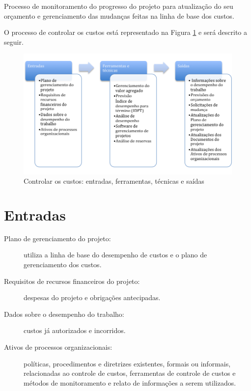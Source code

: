 
Processo de monitoramento do progresso do projeto para atualização do seu orçamento e gerenciamento das mudanças feitas na linha de base dos custos.

O processo de controlar os custos está representado na Figura \ref{fig:custos:controlar:efts} e será descrito a seguir.

\begin{figure}[!h]
	\centering
	\includegraphics[scale=0.5]{Figuras/custos_efts_controlar.png}
	\caption{Controlar os custos: entradas, ferramentas, técnicas e saídas}
	\label{fig:custos:controlar:efts}
\end{figure}

\section{Entradas}

\begin{description}
	
	\item[Plano de gerenciamento do projeto:] utiliza a linha de base do desempenho de custos e o plano de gerenciamento dos custos.
	
	\item[Requisitos de recursos financeiros do projeto:] despesas do projeto e obrigações antecipadas.
	
	\item[Dados sobre o desempenho do trabalho:] custos já autorizados e incorridos.
	
	\item[Ativos de processos organizacionais:] políticas, procedimentos e diretrizes existentes, formais ou informais, relacionadas ao controle de custos, ferramentas de controle de custos e métodos de monitoramento e relato de informações a serem utilizados.
	
\end{description}

